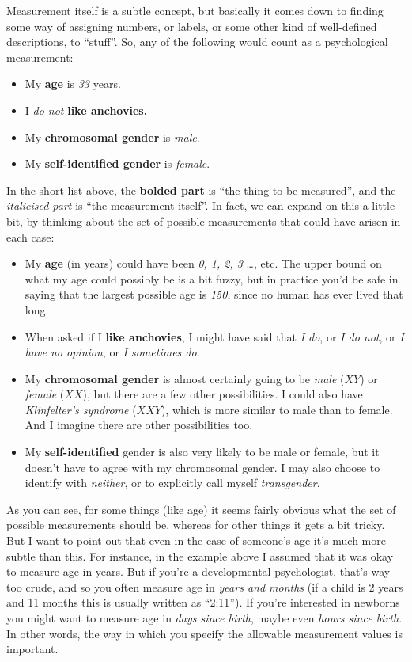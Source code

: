 \documentclass[
  a4paper,
]{book}
\providecommand{\tightlist}{%
  \setlength{\itemsep}{0pt}\setlength{\parskip}{0pt}}\usepackage{longtable,booktabs,array}
\begin{document}
Measurement itself is a subtle concept, but basically it comes down to
finding some way of assigning numbers, or labels, or some other kind of
well-defined descriptions, to ``stuff''. So, any of the following would
count as a psychological measurement:

\begin{itemize}
\tightlist
\item
  My \textbf{age} is \emph{33} years.
\item
  I \emph{do not} \textbf{like anchovies.}
\item
  My \textbf{chromosomal gender} is \emph{male}.
\item
  My \textbf{self-identified gender} is \emph{female}.
\end{itemize}

In the short list above, the \textbf{bolded part} is ``the thing to be
measured'', and the \emph{italicised part} is ``the measurement
itself''. In fact, we can expand on this a little bit, by thinking about
the set of possible measurements that could have arisen in each case:

\begin{itemize}
\tightlist
\item
  My \textbf{age} (in years) could have been \emph{0, 1, 2, 3} \ldots,
  etc. The upper bound on what my age could possibly be is a bit fuzzy,
  but in practice you'd be safe in saying that the largest possible age
  is \emph{150}, since no human has ever lived that long.
\item
  When asked if I \textbf{like anchovies}, I might have said that
  \emph{I do}, or \emph{I do not}, or \emph{I have no opinion}, or
  \emph{I sometimes do.}
\item
  My \textbf{chromosomal gender} is almost certainly going to be
  \emph{male} (\(XY\)) or \emph{female} (\(XX\)), but there are a few
  other possibilities. I could also have \emph{Klinfelter's syndrome}
  (\(XXY\)), which is more similar to male than to female. And I imagine
  there are other possibilities too.
\item
  My \textbf{self-identified} gender is also very likely to be male or
  female, but it doesn't have to agree with my chromosomal gender. I may
  also choose to identify with \emph{neither}, or to explicitly call
  myself \emph{transgender}.
\end{itemize}

As you can see, for some things (like age) it seems fairly obvious what
the set of possible measurements should be, whereas for other things it
gets a bit tricky. But I want to point out that even in the case of
someone's age it's much more subtle than this. For instance, in the
example above I assumed that it was okay to measure age in years. But if
you're a developmental psychologist, that's way too crude, and so you
often measure age in \emph{years and months} (if a child is 2 years and
11 months this is usually written as ``2;11''). If you're interested in
newborns you might want to measure age in \emph{days since birth}, maybe
even \emph{hours since birth}. In other words, the way in which you
specify the allowable measurement values is important.
\end{document}
